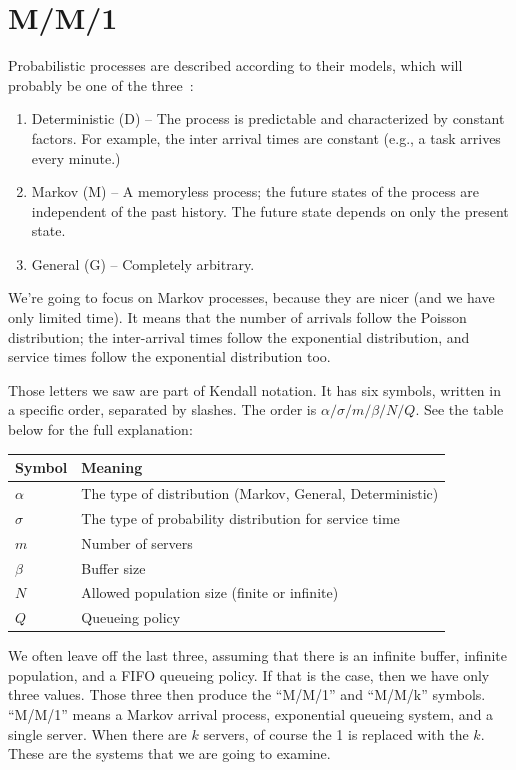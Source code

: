 \documentclass[a4paper]{report}
\begin{document}
\section*{M/M/1}

Probabilistic processes are described according to their models, which will probably be one of the three~\cite{swps}:

\begin{enumerate}
	\item Deterministic (D) -- The process is predictable and characterized by constant factors. For example, the inter arrival times are constant (e.g., a task arrives every minute.)
	\item Markov (M) -- A memoryless process; the future states of the process are independent of the past history. The future state depends on only the present state.
	\item General (G) -- Completely arbitrary.
\end{enumerate}

We're going to focus on Markov processes, because they are nicer (and we have only limited time). It means that the number of arrivals follow the Poisson distribution; the inter-arrival times follow the exponential distribution, and service times follow the exponential distribution too. 

Those letters we saw are part of Kendall notation. It has six symbols, written in a specific order, separated by slashes. The order is $\alpha / \sigma / m / \beta / N / Q$. See the table below for the full explanation:

\begin{center}
\begin{tabular}{l|l} 
	\textbf{Symbol} & \textbf{Meaning} \\ \hline
	$\alpha$ & The type of distribution (Markov, General, Deterministic) \\ \hline
	$\sigma$ & The type of probability distribution for service time \\ \hline
	$m$ & Number of servers \\ \hline
	$\beta$ & Buffer size \\ \hline
	$N$ & Allowed population size (finite or infinite) \\ \hline
	$Q$ & Queueing policy \\ 
\end{tabular}
\end{center}

We often leave off the last three, assuming that there is an infinite buffer, infinite population, and a FIFO queueing policy. If that is the case, then we have only three values. Those three then produce the ``M/M/1'' and ``M/M/k'' symbols. ``M/M/1'' means a Markov arrival process, exponential queueing system, and a single server. When there are $k$ servers, of course the 1 is replaced with the $k$. These are the systems that we are going to examine.
\end{document}
